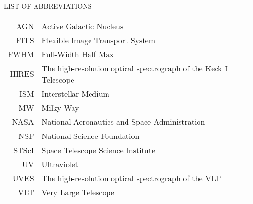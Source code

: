 
\begin{center}
LIST OF ABBREVIATIONS
\end{center}

\begin{tabular}{rl}
AGN       &     Active Galactic Nucleus\\
FITS      &     Flexible Image Transport System\\
FWHM      &     Full-Width Half Max\\
HIRES     &     The high-resolution optical spectrograph of the Keck I Telescope\\
ISM       &     Interstellar Medium\\
MW        &     Milky Way\\
NASA      &     National Aeronautics and Space Administration\\
NSF       &     National Science Foundation\\
STScI     &     Space Telescope Science Institute\\
UV        &     Ultraviolet\\
UVES      &     The high-resolution optical spectrograph of the VLT\\
VLT       &     Very Large Telescope\\
\end{tabular}
